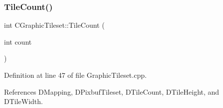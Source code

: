 \subsubsection{\texorpdfstring{Tile\+Count()}{TileCount()}\hspace{0.1cm}{\footnotesize\ttfamily [2/2]}}
{\footnotesize\ttfamily int C\+Graphic\+Tileset\+::\+Tile\+Count (\begin{DoxyParamCaption}\item[{int}]{count }\end{DoxyParamCaption})}



Definition at line 47 of file Graphic\+Tileset.\+cpp.



References D\+Mapping, D\+Pixbuf\+Tileset, D\+Tile\+Count, D\+Tile\+Height, and D\+Tile\+Width.


